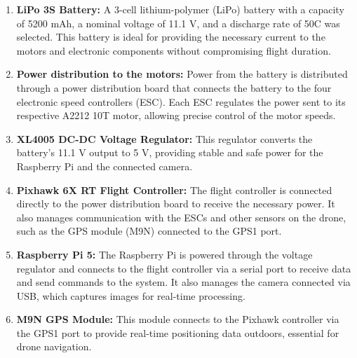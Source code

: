         \begin{enumerate}
            \item \textbf{LiPo 3S Battery:} 
            A 3-cell lithium-polymer (LiPo) battery with a capacity of 5200 mAh, a nominal voltage of 11.1 V, and a discharge rate of 50C was selected. This battery is ideal for providing the necessary current to the motors and electronic components without compromising flight duration.
        
            \item \textbf{Power distribution to the motors:} 
            Power from the battery is distributed through a power distribution board that connects the battery to the four electronic speed controllers (ESC). Each ESC regulates the power sent to its respective A2212 10T motor, allowing precise control of the motor speeds.
        
            \item \textbf{XL4005 DC-DC Voltage Regulator:} 
            This regulator converts the battery’s 11.1 V output to 5 V, providing stable and safe power for the Raspberry Pi and the connected camera.
        
            \item \textbf{Pixhawk 6X RT Flight Controller:} 
            The flight controller is connected directly to the power distribution board to receive the necessary power. It also manages communication with the ESCs and other sensors on the drone, such as the GPS module (M9N) connected to the GPS1 port.
        
            \item \textbf{Raspberry Pi 5:} 
            The Raspberry Pi is powered through the voltage regulator and connects to the flight controller via a serial port to receive data and send commands to the system. It also manages the camera connected via USB, which captures images for real-time processing.
        
            \item \textbf{M9N GPS Module:} 
            This module connects to the Pixhawk controller via the GPS1 port to provide real-time positioning data outdoors, essential for drone navigation.
        
        \end{enumerate}
        
